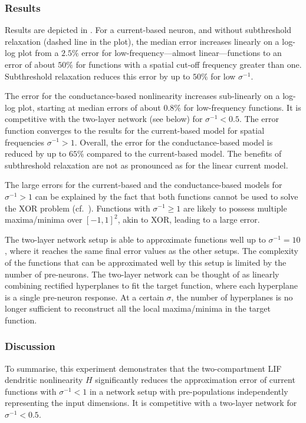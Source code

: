 \subsubsection{Results}
Results are depicted in . For a current-based neuron, and without subthreshold relaxation (dashed line in the plot), the median error increases linearly on a log-log plot from a $2.5\%$ error for low-frequency---almost linear---functions to an error of about $50\%$ for functions with a spatial cut-off frequency greater than one. Subthreshold relaxation reduces this error by up to $50\%$ for low $\sigma^{-1}$.

The error for the conductance-based nonlinearity increases sub-linearly on a log-log plot, starting at median errors of about $0.8\%$ for low-frequency functions. It is competitive with the two-layer network (see below) for $\sigma^{-1} < 0.5$. The error function converges to the results for the current-based model for spatial frequencies $\sigma^{-1} > 1$. Overall, the error for the conductance-based model is reduced by up to $65\%$ compared to the current-based model. The benefits of subthreshold relaxation are not as pronounced as for the linear current model.

The large errors for the current-based and the conductance-based models for $\sigma^{-1} > 1$ can be explained by the fact that both functions cannot be used to solve the XOR problem (cf.~). Functions with $\sigma^{-1} \geq 1$ are likely to possess multiple maxima/minima over $[-1, 1]^2$, akin to XOR, leading to a large error.

The two-layer network setup is able to approximate functions well up to $\sigma^{-1} = 10$, where it reaches the same final error values as the other setups. The complexity of the functions that can be approximated well by this setup is limited by the number of pre-neurons. The two-layer network can be thought of as linearly combining rectified hyperplanes to fit the target function, where each hyperplane is a single pre-neuron response. At a certain $\sigma$, the number of hyperplanes is no longer sufficient to reconstruct all the local maxima/minima in the target function.

\subsubsection{Discussion}
To summarise, this experiment demonstrates that the two-compartment LIF dendritic nonlinearity $H$ significantly reduces the approximation error of current functions with $\sigma^{-1} < 1$ in a network setup with pre-populations independently representing the input dimensions. It is competitive with a two-layer network for $\sigma^{-1} < 0.5$.


